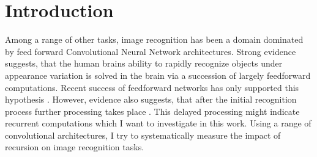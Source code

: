 \section{Introduction}\label{introduction}
Among a range of other tasks, image recognition has been a domain dominated by feed forward Convolutional Neural Network architectures. Strong evidence suggests, that the human brains ability to rapidly recognize objects under appearance variation is solved in the brain via a succession of largely feedforward computations. \cite[2012]{DICARLO2012415} Recent success of feedforward networks has only supported this hypothesis \cite{NIPS2012_4824}. However, evidence also suggests, that after the initial recognition process further processing takes place \cite{Sugase1999}. This delayed processing might indicate recurrent computations which I want to investigate in this work.
Using a range of convolutional architectures, I try to systematically measure the impact of recursion on image recognition tasks.
